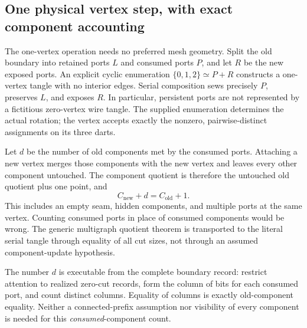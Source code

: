 \subsection{One physical vertex step, with exact component accounting}
\label{sec:physical-vertex-attachment}

The one-vertex operation needs no preferred mesh geometry. Split the
old boundary into retained ports $L$ and consumed ports $P$, and let
$R$ be the new exposed ports. An explicit cyclic enumeration
$\{0,1,2\}\simeq P+R$ constructs a one-vertex tangle with no interior
edges. Serial composition sews precisely $P$, preserves $L$, and
exposes $R$. In particular, persistent ports are not represented by a
fictitious zero-vertex wire tangle. The supplied enumeration determines
the actual rotation; the vertex accepts exactly the nonzero,
pairwise-distinct assignments on its three darts.

Let $d$ be the number of old components met by the consumed ports.
Attaching a new vertex merges those components with the new vertex and
leaves every other component untouched. The component quotient is
therefore the untouched old quotient plus one point, and
\[
 C_{\mathrm{new}}+d=C_{\mathrm{old}}+1.
\]
This includes an empty seam, hidden components, and multiple ports at
the same vertex. Counting consumed ports in place of consumed
components would be wrong. The generic multigraph quotient theorem is
transported to the literal serial tangle through equality of all cut
sizes, not through an assumed component-update hypothesis.

The number $d$ is executable from the complete boundary record:
restrict attention to realized zero-cut records, form the column of
bits for each consumed port, and count distinct columns. Equality of
columns is exactly old-component equality. Neither a connected-prefix
assumption nor visibility of every component is needed for this
\emph{consumed}-component count.

